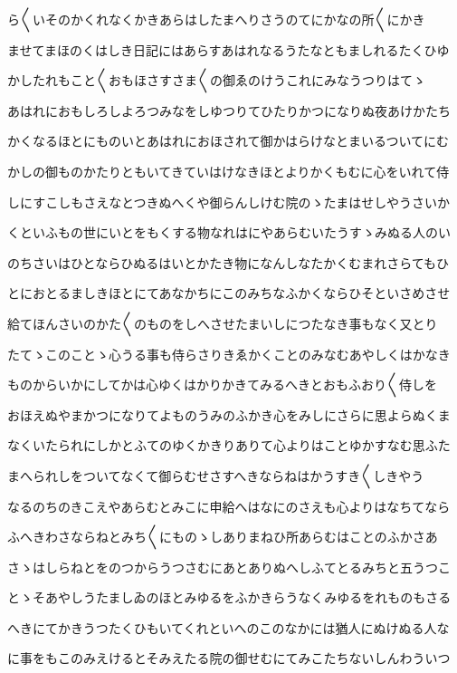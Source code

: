 \documentclass[a4paper,11pt,landscape]{ltjtarticle}
\begin{document}
ら〱いそのかくれなくかきあらはしたまへりさうのてにかなの所〱にかき
\par\medskip
ませてまほのくはしき日記にはあらすあはれなるうたなともましれるたくひゆ
\par\medskip
かしたれもこと〱おもほさすさま〱の御ゑのけうこれにみなうつりはてゝ
\par\medskip
あはれにおもしろしよろつみなをしゆつりてひたりかつになりぬ夜あけかたち
\par\medskip
かくなるほとにものいとあはれにおほされて御かはらけなとまいるついてにむ
\par\medskip
かしの御ものかたりともいてきていはけなきほとよりかくもむに心をいれて侍
\par\medskip
しにすこしもさえなとつきぬへくや御らんしけむ院のゝたまはせしやうさいか
\par\medskip
くといふもの世にいとをもくする物なれはにやあらむいたうすゝみぬる人のい
\par\medskip
のちさいはひとならひぬるはいとかたき物になんしなたかくむまれさらてもひ
\par\medskip
とにおとるましきほとにてあなかちにこのみちなふかくならひそといさめさせ
\par\medskip
給てほんさいのかた〱のものをしへさせたまいしにつたなき事もなく又とり
\par\medskip
たてゝこのことゝ心うる事も侍らさりきゑかくことのみなむあやしくはかなき
\par\medskip
ものからいかにしてかは心ゆくはかりかきてみるへきとおもふおり〱侍しを
\par\medskip
おほえぬやまかつになりてよものうみのふかき心をみしにさらに思よらぬくま
\par\medskip
なくいたられにしかとふてのゆくかきりありて心よりはことゆかすなむ思ふた
\par\medskip
まへられしをついてなくて御らむせさすへきならねはかうすき〱しきやう
\par\medskip
なるのちのきこえやあらむとみこに申給へはなにのさえも心よりはなちてなら
\par\medskip
ふへきわさならねとみち〱にものゝしありまねひ所あらむはことのふかさあ
\par\medskip
さゝはしらねとをのつからうつさむにあとありぬへしふてとるみちと五うつこ
\par\medskip
とゝそあやしうたましゐのほとみゆるをふかきらうなくみゆるをれものもさる
\par\medskip
へきにてかきうつたくひもいてくれといへのこのなかには猶人にぬけぬる人な
\par\medskip
に事をもこのみえけるとそみえたる院の御せむにてみこたちないしんわういつ
\end{document}
